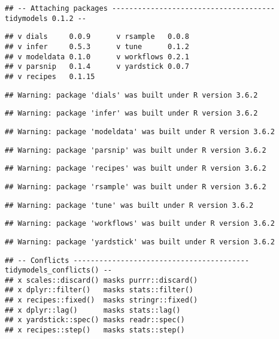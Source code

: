 \documentclass[]{article}
\begin{document}
\begin{verbatim}
## -- Attaching packages -------------------------------------- tidymodels 0.1.2 --
\end{verbatim}

\begin{verbatim}
## v dials     0.0.9      v rsample   0.0.8 
## v infer     0.5.3      v tune      0.1.2 
## v modeldata 0.1.0      v workflows 0.2.1 
## v parsnip   0.1.4      v yardstick 0.0.7 
## v recipes   0.1.15
\end{verbatim}

\begin{verbatim}
## Warning: package 'dials' was built under R version 3.6.2
\end{verbatim}

\begin{verbatim}
## Warning: package 'infer' was built under R version 3.6.2
\end{verbatim}

\begin{verbatim}
## Warning: package 'modeldata' was built under R version 3.6.2
\end{verbatim}

\begin{verbatim}
## Warning: package 'parsnip' was built under R version 3.6.2
\end{verbatim}

\begin{verbatim}
## Warning: package 'recipes' was built under R version 3.6.2
\end{verbatim}

\begin{verbatim}
## Warning: package 'rsample' was built under R version 3.6.2
\end{verbatim}

\begin{verbatim}
## Warning: package 'tune' was built under R version 3.6.2
\end{verbatim}

\begin{verbatim}
## Warning: package 'workflows' was built under R version 3.6.2
\end{verbatim}

\begin{verbatim}
## Warning: package 'yardstick' was built under R version 3.6.2
\end{verbatim}

\begin{verbatim}
## -- Conflicts ----------------------------------------- tidymodels_conflicts() --
## x scales::discard() masks purrr::discard()
## x dplyr::filter()   masks stats::filter()
## x recipes::fixed()  masks stringr::fixed()
## x dplyr::lag()      masks stats::lag()
## x yardstick::spec() masks readr::spec()
## x recipes::step()   masks stats::step()
\end{verbatim}
\end{document}

